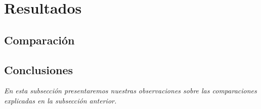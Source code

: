 \section{Resultados}

\subsection{Comparaci\'on}


\subsection{Conclusiones}

\textsl{En esta subsecci\'on presentaremos nuestras observaciones
sobre las comparaciones explicadas en la subsecci\'on anterior.}

\vspace*{0.5cm}






